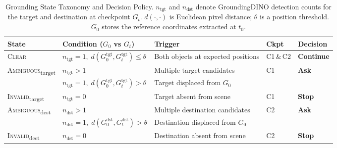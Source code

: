 

\begin{table}[t]
\centering
\caption{Grounding State Taxonomy and Decision Policy.
$n_\text{tgt}$ and $n_\text{dst}$ denote GroundingDINO detection counts for the
target and destination at checkpoint $G_t$.
$d(\cdot,\cdot)$ is Euclidean pixel distance; $\theta$ is a position threshold.
$G_0$ stores the reference coordinates extracted at $t_0$.}
\label{tab:taxonomy}
\renewcommand{\arraystretch}{1.25}
\begin{tabular}{lllll}
\toprule
\textbf{State} &
\textbf{Condition} ($G_0$ vs $G_t$) &
\textbf{Trigger} &
\textbf{Ckpt} &
\textbf{Decision} \\
\midrule

\textsc{Clear}
  & $n_\text{tgt}{=}1,\; d(G_0^\text{tgt}, G_t^\text{tgt}) \leq \theta$
  & Both objects at expected positions
  & C1\,\&\,C2
  & \textcolor{contgreen}{\textbf{Continue}} \\[2pt]

\midrule

\multirow{2}{*}{\textsc{Ambiguous}\textsubscript{target}}
  & $n_\text{tgt} > 1$
  & Multiple target candidates
  & \multirow{2}{*}{C1}
  & \multirow{2}{*}{\textcolor{askamber}{\textbf{Ask}}} \\
  & $n_\text{tgt}{=}1,\; d(G_0^\text{tgt}, G_t^\text{tgt}) > \theta$
  & Target displaced from $G_0$
  & & \\[2pt]

\midrule

\textsc{Invalid}\textsubscript{target}
  & $n_\text{tgt} = 0$
  & Target absent from scene
  & C1
  & \textcolor{stopred}{\textbf{Stop}} \\[2pt]

\midrule

\multirow{2}{*}{\textsc{Ambiguous}\textsubscript{dest}}
  & $n_\text{dst} > 1$
  & Multiple destination candidates
  & \multirow{2}{*}{C2}
  & \multirow{2}{*}{\textcolor{askamber}{\textbf{Ask}}} \\
  & $n_\text{dst}{=}1,\; d(G_0^\text{dst}, G_t^\text{dst}) > \theta$
  & Destination displaced from $G_0$
  & & \\[2pt]

\midrule

\textsc{Invalid}\textsubscript{dest}
  & $n_\text{dst} = 0$
  & Destination absent from scene
  & C2
  & \textcolor{stopred}{\textbf{Stop}} \\

\bottomrule
\end{tabular}
\end{table}
